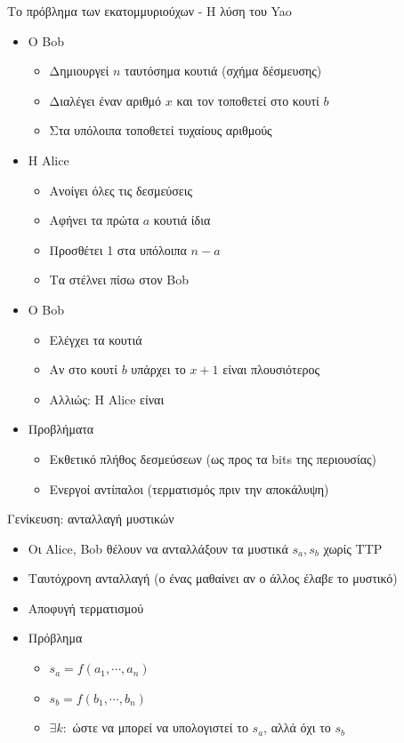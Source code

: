 \documentclass{beamer}
\begin{document}
\begin{frame}{Το πρόβλημα των εκατομμυριούχων - Η λύση του Yao}
	\begin{itemize}
		\item Ο Bob
		\begin{itemize}
			\item Δημιουργεί $n$ ταυτόσημα κουτιά (σχήμα δέσμευσης)
			\item Διαλέγει έναν αριθμό $x$ και τον τοποθετεί στο κουτί $b$
			\item Στα υπόλοιπα τοποθετεί τυχαίους αριθμούς 
		\end{itemize} \pause 
		\item H Alice
		\begin{itemize}
			\item Ανοίγει όλες τις δεσμεύσεις
			\item Αφήνει τα πρώτα $a$ κουτιά ίδια
			\item Προσθέτει 1 στα υπόλοιπα $n-a$
			\item Τα στέλνει πίσω στον Bob
		\end{itemize} \pause 
		\item Ο Bob
		\begin{itemize}
			\item Ελέγχει τα κουτιά
			\item Αν στο κουτί $b$ υπάρχει το $x+1$ είναι πλουσιότερος
			\item Αλλιώς: Η Alice είναι
		\end{itemize} \pause 
		\item \alert{Προβλήματα} \pause 
		\begin{itemize}
			\item Εκθετικό πλήθος δεσμεύσεων (ως προς τα bits της περιουσίας)
			\item Ενεργοί αντίπαλοι (τερματισμός πριν την αποκάλυψη)
		\end{itemize}
	\end{itemize}
\end{frame}

\begin{frame}{Γενίκευση: ανταλλαγή μυστικών}
	\begin{itemize}
		\item Οι Alice, Bob θέλουν να ανταλλάξουν τα μυστικά $s_a,s_b$ χωρίς TTP
		\item Ταυτόχρονη ανταλλαγή (ο ένας μαθαίνει αν ο άλλος έλαβε το μυστικό)
		\item Αποφυγή τερματισμού 
		\item Πρόβλημα
		\begin{itemize}
			\item $s_a = f(a_1, \cdots, a_n)$
			\item $s_b = f(b_1, \cdots, b_n)$
			\item $\exists k:$ ώστε να μπορεί να υπολογιστεί το $s_a$, αλλά όχι το $s_b$
		\end{itemize}
	\end{itemize}
\end{frame}
\end{document}
